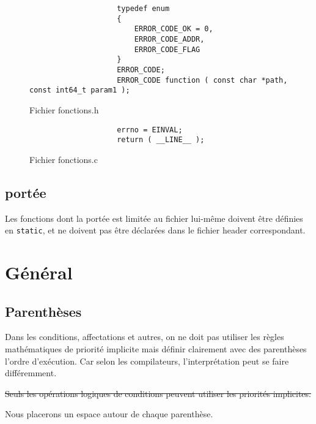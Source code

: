 			\begin{figure}[H]
				\begin{changemargin}{-2.5cm}{-2.5cm}
				\begin{tcolorbox}
				\begin{verbatim}
					typedef enum
					{
					    ERROR_CODE_OK = 0,
					    ERROR_CODE_ADDR,
					    ERROR_CODE_FLAG
					}
					ERROR_CODE;
					ERROR_CODE function ( const char *path, const int64_t param1 );
				\end{verbatim}
				\end{tcolorbox}
				\end{changemargin}
				\caption{Fichier fonctions.h}

				\begin{changemargin}{-2.5cm}{-2.5cm}
				\begin{tcolorbox}
				\begin{verbatim}
					errno = EINVAL;
					return ( __LINE__ );
				\end{verbatim}
				\end{tcolorbox}
				\end{changemargin}
				\caption{Fichier fonctions.c}
			\end{figure}

		\subsection{portée}
			Les fonctions dont la portée est limitée au fichier lui-même doivent être définies en \verb+static+, et ne doivent pas être déclarées dans le fichier header correspondant.

	\section{Général}
		\subsection{Parenthèses}
			Dans les conditions, affectations et autres, on ne doit pas utiliser les règles mathématiques de priorité implicite mais définir clairement avec des parenthèses l'ordre d'exécution. Car selon les compilateurs, l'interprétation peut se faire différemment.

			\sout{Seuls les opérations logiques de conditions peuvent utiliser les priorités implicites.}

			Nous placerons un espace autour de chaque parenthèse.

